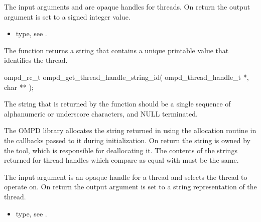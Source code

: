 \argdesc
The input arguments  and  are opaque handles for threads.
On return the output argument  is set to a signed integer value.

\crossreferences
\begin{itemize}
	\item {} type, see .
\end{itemize}

\label{ompd:ompd_get_thread_handle_string_id}
\summary
The  function returns a string
that contains a unique printable value that identifies the thread.

\format

\begin{cspecific}
\begin{ompSyntax}
ompd_rc_t ompd_get_thread_handle_string_id(
  ompd_thread_handle_t *,
  char **
);
\end{ompSyntax}
\end{cspecific}


\descr
The string that is returned by the function should be a single sequence of alphanumeric or 
underscore characters, and NULL terminated.

The OMPD library allocates the string returned in  using the allocation 
routine in the callbacks passed to it during initialization. On return the string is owned by the 
tool, which is responsible for deallocating it. The contents of the strings returned for thread 
handles which compare as equal with  must be the same.

\argdesc
The input argument  is an opaque handle for a thread  and selects the thread to operate on.
On return the output argument  is set to a string representation of the thread.


\crossreferences
\begin{itemize}
	\item {} type, see .
\end{itemize}

